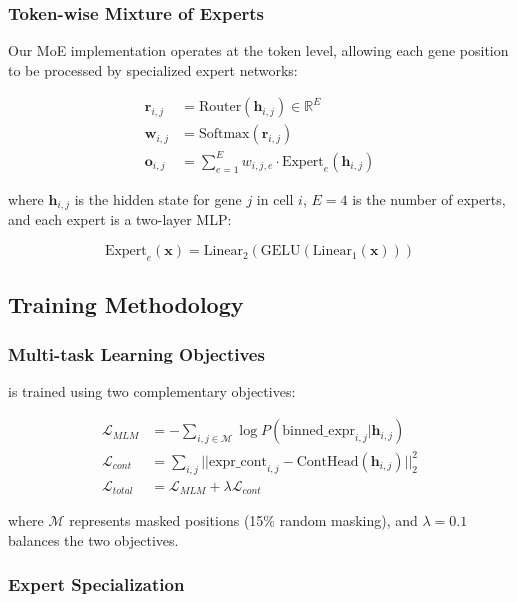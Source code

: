 \subsubsection{Token-wise Mixture of Experts}

Our MoE implementation operates at the token level, allowing each gene position to be processed by specialized expert networks:

\begin{align}
\mathbf{r}_{i,j} &= \text{Router}(\mathbf{h}_{i,j}) \in \mathbb{R}^{E} \\
\mathbf{w}_{i,j} &= \text{Softmax}(\mathbf{r}_{i,j}) \\
\mathbf{o}_{i,j} &= \sum_{e=1}^{E} w_{i,j,e} \cdot \text{Expert}_e(\mathbf{h}_{i,j})
\end{align}

where $\mathbf{h}_{i,j}$ is the hidden state for gene $j$ in cell $i$, $E=4$ is the number of experts, and each expert is a two-layer MLP:

\begin{equation}
\text{Expert}_e(\mathbf{x}) = \text{Linear}_2(\text{GELU}(\text{Linear}_1(\mathbf{x})))
\end{equation}

\subsection{Training Methodology}

\subsubsection{Multi-task Learning Objectives}

\bioformer{} is trained using two complementary objectives:

\begin{align}
\mathcal{L}_{MLM} &= -\sum_{i,j \in \mathcal{M}} \log P(\text{binned\_expr}_{i,j} | \mathbf{h}_{i,j}) \\
\mathcal{L}_{cont} &= \sum_{i,j} ||\text{expr\_cont}_{i,j} - \text{ContHead}(\mathbf{h}_{i,j})||_2^2 \\
\mathcal{L}_{total} &= \mathcal{L}_{MLM} + \lambda \mathcal{L}_{cont}
\end{align}

where $\mathcal{M}$ represents masked positions (15\% random masking), and $\lambda = 0.1$ balances the two objectives.

\subsubsection{Expert Specialization}

